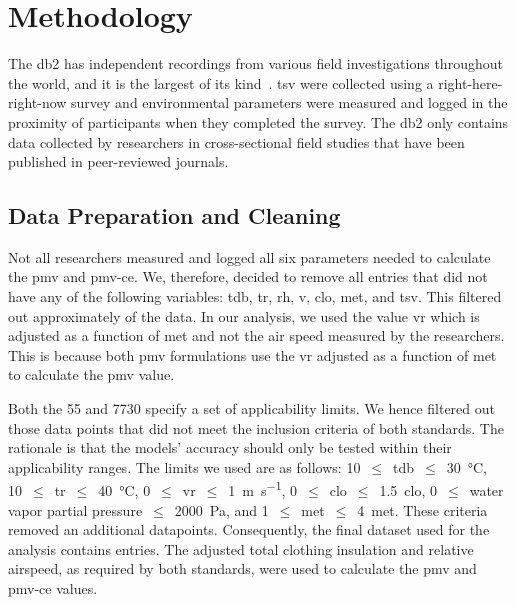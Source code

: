 \section{Methodology}\label{sec:methodology}
The \ac{db2} has  independent recordings from various field investigations throughout the world, and it is the largest of its kind~\cite{FoldvaryLicina2018, db2dryad}.
\Ac{tsv} were collected using a right-here-right-now survey and environmental parameters were measured and logged in the proximity of participants when they completed the survey.
The \ac{db2} only contains data collected by researchers in cross-sectional field studies that have been published in peer-reviewed journals.

\subsection{Data Preparation and Cleaning}\label{subsec:data-processing-and-cleaning}
Not all researchers measured and logged all six parameters needed to calculate the \ac{pmv} and \ac{pmv-ce}.
We, therefore, decided to remove all entries that did not have any of the following variables: \ac{tdb}, \ac{tr}, \ac{rh}, \ac{v}, \ac{clo}, \ac{met}, and \ac{tsv}.
This filtered out approximately  of the data.
In our analysis, we used the value \ac{vr} which is adjusted as a function of \ac{met} and not the air speed measured by the researchers.
This is because both \ac{pmv} formulations use the \ac{vr} adjusted as a function of \ac{met} to calculate the \ac{pmv} value.

Both the \gls{55} and \gls{7730} specify a set of applicability limits.
We hence filtered out those data points that did not meet the inclusion criteria of both standards.
The rationale is that the models' accuracy should only be tested within their applicability ranges.
The limits we used are as follows:
\num{10}~$\leq$~\ac{tdb}~$\leq$~\qty{30}{\celsius},
\num{10}~$\leq$~\ac{tr}~$\leq$~\qty{40}{\celsius},
\num{0}~$\leq$~\ac{vr}~$\leq$~\qty{1}{\m\per\s},
\num{0}~$\leq$~\ac{clo}~$\leq$~\qty{1.5}{clo},
\num{0}~$\leq$~water vapor partial pressure~$\leq$~\qty{2000}{\pascal},
and \num{1}~$\leq$~\ac{met}~$\leq$~\qty{4}{met}.
These criteria removed an additional  datapoints.
Consequently, the final dataset used for the analysis contains  entries.
The adjusted total clothing insulation and relative airspeed, as required by both standards, were used to calculate the \ac{pmv} and \ac{pmv-ce} values.

